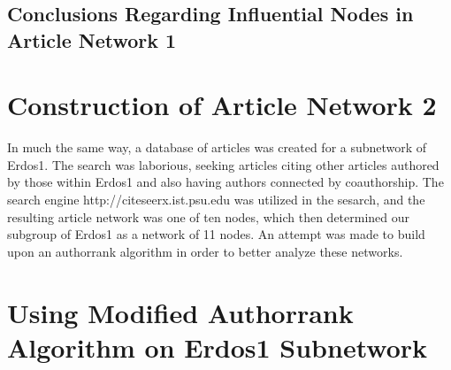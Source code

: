 \documentclass[14pt]{article} %
\begin{document}
    \subsection{Conclusions Regarding Influential Nodes in Article Network 1}
\section{Construction of Article Network 2}
In much the same way, a database of articles was created for a subnetwork of Erdos1. The search was laborious, seeking articles citing other articles authored by those within Erdos1 and also having authors connected by coauthorship. The search engine http://citeseerx.ist.psu.edu was utilized in the sesarch, and the resulting article network was one of ten nodes, which then determined our subgroup of Erdos1 as a network of 11 nodes. An attempt was made to build upon an authorrank algorithm in order to better analyze these networks.
\section{Using Modified Authorrank Algorithm on Erdos1 Subnetwork}
\end{document}

